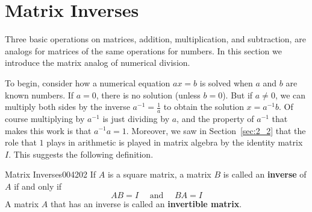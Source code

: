 \section{Matrix Inverses}
\label{sec:2_4}

Three basic operations on matrices, addition, multiplication, and subtraction, are analogs for matrices of the same operations for numbers. In this section we introduce the matrix analog of numerical division.


To begin, consider how a numerical equation $ax = b$ is solved when $a$ and $b$ are known numbers. If $a = 0$, there is no solution (unless $b = 0$). But if $a \neq 0$, we can multiply both sides by the inverse $a^{-1} = \frac{1}{a}$ to obtain the solution $x = a^{-1}b$. Of course multiplying by $a^{-1}$ is just dividing by $a$, and the property of $a^{-1}$ that makes this work is that $a^{-1}a = 1$. Moreover, we saw in Section~\ref{sec:2_2} that the role that $1$ plays in arithmetic is played in matrix algebra by the identity matrix $I$. This suggests the following definition. 


\begin{definition}{Matrix Inverses}{004202}
If $A$ is a square matrix, a matrix $B$ is called an \textbf{inverse} of $A$ if and only if
\begin{equation*}
AB = I \quad \mbox{ and } \quad BA = I
\end{equation*}
A matrix $A$ that has an inverse is called an \textbf{invertible matrix}.\footnotemark
\end{definition}


